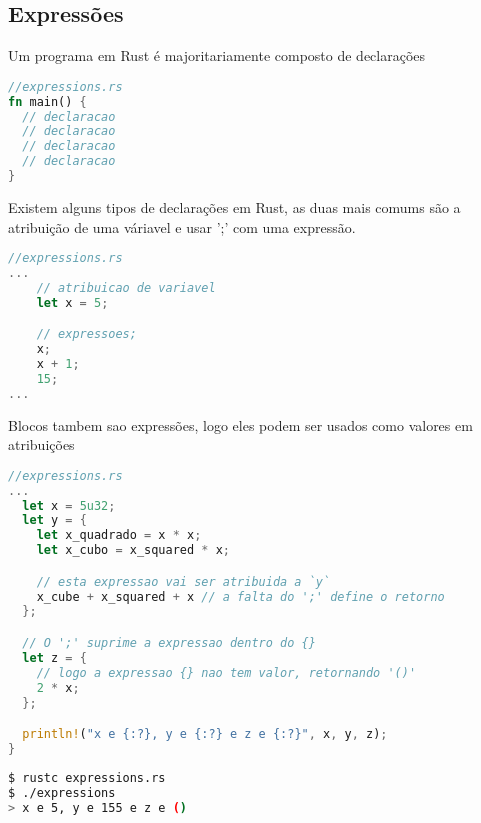 \subsection{Express\~{o}es}

Um programa em Rust é majoritariamente composto de declarações

\begin{lstlisting}[language=rust]
//expressions.rs
fn main() {
  // declaracao 
  // declaracao 
  // declaracao 
  // declaracao 
}
\end{lstlisting}

\pagebreak
\newpage

Existem alguns tipos de declarações em Rust, as duas mais comums são a atribuição de uma váriavel e usar ';' com uma expressão.

\begin{lstlisting}[language=rust]
//expressions.rs
...
    // atribuicao de variavel
    let x = 5;

    // expressoes;
    x;
    x + 1;
    15;
...
\end{lstlisting}
Blocos tambem sao expressões, logo eles podem ser usados como valores em atribuições
\begin{lstlisting}[language=rust]
//expressions.rs
...
  let x = 5u32;
  let y = {
    let x_quadrado = x * x;
    let x_cubo = x_squared * x;

    // esta expressao vai ser atribuida a `y`
    x_cube + x_squared + x // a falta do ';' define o retorno
  };

  // O ';' suprime a expressao dentro do {}
  let z = {
    // logo a expressao {} nao tem valor, retornando '()'
    2 * x;
  };

  println!("x e {:?}, y e {:?} e z e {:?}", x, y, z);
}
\end{lstlisting}
\begin{lstlisting}[language=bash]
$ rustc expressions.rs
$ ./expressions
> x e 5, y e 155 e z e ()
\end{lstlisting}
